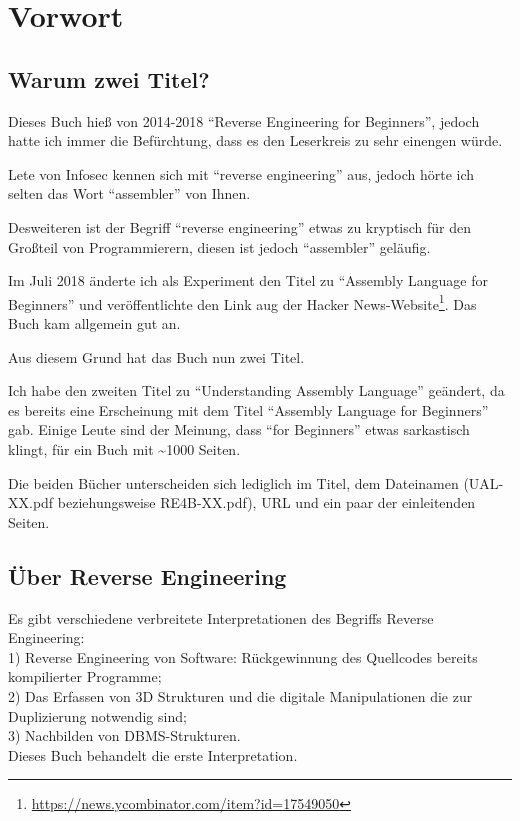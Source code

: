 \section*{Vorwort}

\subsection*{Warum zwei Titel?}
\label{TwoTitles}

Dieses Buch hieß von 2014-2018 ``Reverse Engineering for Beginners'', jedoch hatte ich immer die Befürchtung, dass es den Leserkreis zu sehr einengen würde.

Lete von Infosec kennen sich mit ``reverse engineering'' aus, jedoch hörte  ich selten das Wort ``assembler'' von Ihnen.

Desweiteren ist der Begriff ``reverse engineering'' etwas zu kryptisch für den Großteil von Programmierern, diesen ist jedoch ``assembler'' geläufig.

Im Juli 2018 änderte ich als Experiment den Titel zu ``Assembly Language for Beginners'' und veröffentlichte den Link aug der Hacker News-Website\footnote{\url{https://news.ycombinator.com/item?id=17549050}}. Das Buch kam allgemein gut an.

Aus diesem Grund hat das Buch nun zwei Titel.

Ich habe den zweiten Titel zu ``Understanding Assembly Language'' geändert, da es bereits eine Erscheinung mit dem Titel ``Assembly Language for Beginners'' gab. Einige Leute sind der Meinung, dass ``for Beginners'' etwas sarkastisch klingt, für ein Buch mit \textasciitilde{}1000 Seiten.

Die beiden Bücher unterscheiden sich lediglich im Titel, dem Dateinamen (UAL-XX.pdf beziehungsweise RE4B-XX.pdf), URL und ein paar der einleitenden Seiten.

\subsection*{Über Reverse Engineering}

Es gibt verschiedene verbreitete Interpretationen des Begriffs Reverse Engineering:\\
1) Reverse Engineering von Software: Rückgewinnung des Quellcodes bereits kompilierter Programme;\\
2) Das Erfassen von 3D Strukturen und die digitale Manipulationen die zur Duplizierung notwendig sind;\\
3) Nachbilden von \ac{DBMS}-Strukturen.\\
Dieses Buch behandelt die erste Interpretation.

